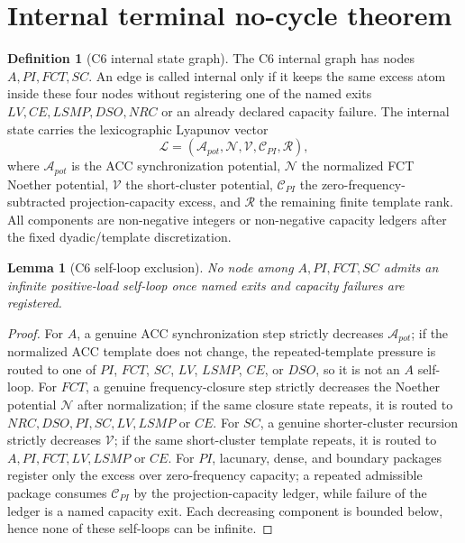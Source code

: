 \documentclass[11pt]{article}
\newtheorem{lemma}[theorem]{Lemma}
\theoremstyle{definition}
\newtheorem{definition}[theorem]{Definition}
\begin{document}
\section{Internal terminal no-cycle theorem}\label{sec:terminal}
\begin{definition}[C6 internal state graph]\label{def:c6-graph}
The C6 internal graph has nodes $A,PI,FCT,SC$.  An edge is called internal only if it keeps the same excess atom inside these four nodes without registering one of the named exits $LV,CE,LSMP,DSO,NRC$ or an already declared capacity failure.  The internal state carries the lexicographic Lyapunov vector
\[
  \mathcal L=(\mathcal A_{pot},\mathcal N,\mathcal V,\mathcal C_{PI},\mathcal R),
\]
where $\mathcal A_{pot}$ is the ACC synchronization potential, $\mathcal N$ the normalized FCT Noether potential, $\mathcal V$ the short-cluster potential, $\mathcal C_{PI}$ the zero-frequency-subtracted projection-capacity excess, and $\mathcal R$ the remaining finite template rank.  All components are non-negative integers or non-negative capacity ledgers after the fixed dyadic/template discretization.
\end{definition}

\begin{lemma}[C6 self-loop exclusion]\label{lem:c6-self}
No node among $A,PI,FCT,SC$ admits an infinite positive-load self-loop once named exits and capacity failures are registered.
\end{lemma}
\begin{proof}
For $A$, a genuine ACC synchronization step strictly decreases $\mathcal A_{pot}$; if the normalized ACC template does not change, the repeated-template pressure is routed to one of $PI$, $FCT$, $SC$, $LV$, $LSMP$, $CE$, or $DSO$, so it is not an $A$ self-loop.  For $FCT$, a genuine frequency-closure step strictly decreases the Noether potential $\mathcal N$ after normalization; if the same closure state repeats, it is routed to $NRC,DSO,PI,SC,LV,LSMP$ or $CE$.  For $SC$, a genuine shorter-cluster recursion strictly decreases $\mathcal V$; if the same short-cluster template repeats, it is routed to $A,PI,FCT,LV,LSMP$ or $CE$.  For $PI$, lacunary, dense, and boundary packages register only the excess over zero-frequency capacity; a repeated admissible package consumes $\mathcal C_{PI}$ by the projection-capacity ledger, while failure of the ledger is a named capacity exit.  Each decreasing component is bounded below, hence none of these self-loops can be infinite.
\end{proof}
\end{document}
